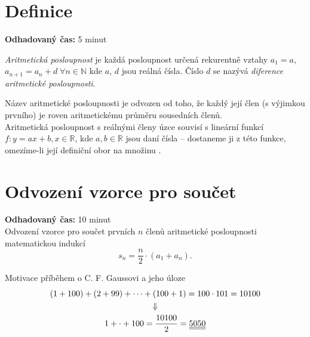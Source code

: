 \documentclass[12pt,a4paper,addpoints]{article}
\begin{document}
    \section{Definice}
    \textbf{Odhadovaný čas:} 5 minut
    \begin{definition}
        \textit{Aritmetická posloupnost} je každá posloupnost určená rekurentně vztahy 
        $a_1 = a$, $a_{n+1} = a_n + d \; \forall n \in \mathbb{N}$ kde $a$, $d$ jsou reálná čísla. 
        Číslo $d$ se nazývá \textit{diference aritmetické posloupnosti}.
    \end{definition}

    Název aritmetické posloupnosti je odvozen od toho, že každý její člen (s výjimkou prvního) je roven
    aritmetickému průměru sousedních členů.\\
    Aritmetická posloupnost s reálnými členy úzce souvisí s lineární funkcí $f:y=ax+b, x\in \mathbb{R}$, 
    kde $a, b \in \mathbb{R}$ jsou daní čísla -- dostaneme ji z této funkce, omezíme-li její definiční 
    obor na množinu . 

    \section{Odvození vzorce pro součet}
    \textbf{Odhadovaný čas:} 10 minut\\
        Odvození vzorce pro součet prvních $n$ členů aritmetické posloupnosti matematickou indukcí 
        $$s_n = \dfrac{n}{2} \cdot (a_1 + a_n).$$

        \begin{example}
            Motivace příběhem o C. F. Gaussovi a jeho úloze \\
            \begin{gather*}
                (1 + 100) + (2 + 99) + \dots + (100 + 1) = 100 \cdot 101 = 10 100 \\
                \Downarrow\\
                1 + \cdot + 100 = \dfrac{10 100}{2} = \underline{\underline{5 050}}        
            \end{gather*}
        \end{example}
            
\end{document}
